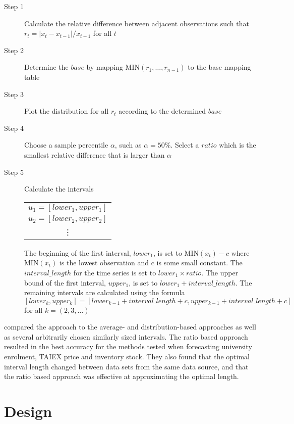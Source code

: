 \documentclass{article}
\theoremstyle{definition}
\begin{document}
\begin{description}
\item[Step 1] Calculate the relative difference between adjacent observations such that $r_t=|x_t-x_{t-1}|/x_{t-1}$ for all $t$
\item[Step 2] Determine the $base$ by mapping MIN$(r_1,\ldots,r_{n-1})$ to the base mapping table
\item[Step 3] Plot the distribution for all $r_t$ according to the determined $base$
\item[Step 4] Choose a sample percentile $\alpha$, such as $\alpha=50\%$. Select a $ratio$ which is the smallest relative difference that is larger than $\alpha$
\item[Step 5] Calculate the intervals 

\begin{table}[H]
	\center
	\begin{tabular}{ c }
	  	$u_1 = [lower_1, upper_1]$ \\
	  	$u_2 = [lower_2, upper_2]$ \\
	  	\vdots \\
	\end{tabular}
\end{table}

The beginning of the first interval, $lower_1$, is set to MIN$(x_t)-c$ where MIN$(x_t)$ is the lowest observation and c is some small constant. The $interval\_length$ for the time series is set to $lower_1 \times ratio$. The upper bound of the first interval, $upper_1$, is set to $lower_1 + interval\_length$. The remaining intervals are calculated using the formula $[lower_k,upper_k]=[lower_{k-1}+interval\_length+c, upper_{k-1}+interval\_length+c]$ for all $k=(2,3,\ldots)$
\end{description}

\cite{huarng2006ratio} compared the approach to the average- and distribution-based approaches as well as several arbitrarily chosen similarly sized intervals. The ratio based approach resulted in the best accuracy for the methods tested when forecasting university enrolment, TAIEX price and inventory stock. They also found that the optimal interval length changed between data sets from the same data source, and that the ratio based approach was effective at approximating the optimal length.


\section{Design}
\end{document}
